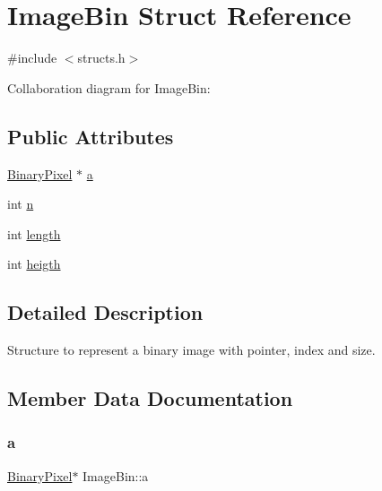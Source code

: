 \hypertarget{structImageBin}{}\section{Image\+Bin Struct Reference}
\label{structImageBin}


{\ttfamily \#include $<$structs.\+h$>$}



Collaboration diagram for Image\+Bin\+:
\subsection*{Public Attributes}
\begin{DoxyCompactItemize}
\item 
\hyperlink{structBinaryPixel}{Binary\+Pixel} $\ast$ \hyperlink{structImageBin_a0549f38be700a48c6dae62a66e2277cd}{a}
\item 
int \hyperlink{structImageBin_a7ca58eb8b2e6c7de6698a2596bd1ab59}{n}
\item 
int \hyperlink{structImageBin_a9ef9ab5f89fcb7e82ad84a8c0c537add}{length}
\item 
int \hyperlink{structImageBin_abbfd6bd9009e4f3964fbd22466920387}{heigth}
\end{DoxyCompactItemize}


\subsection{Detailed Description}
Structure to represent a binary image with pointer, index and size. 

\subsection{Member Data Documentation}
\mbox{\label{structImageBin_a0549f38be700a48c6dae62a66e2277cd}} 
\subsubsection{\texorpdfstring{a}{a}}
{\footnotesize\ttfamily \hyperlink{structBinaryPixel}{Binary\+Pixel}$\ast$ Image\+Bin\+::a}

\mbox{\label{structImageBin_abbfd6bd9009e4f3964fbd22466920387}} 
